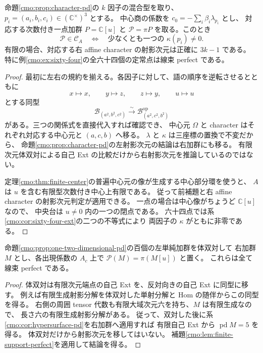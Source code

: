 \begin{proposition}
\label{cmo:prop:point-perfect}
命題\ref{cmo:prop:character-pd}の $k$ 因子の混合型を取り、
$p_i=(a_i,b_i,c_i)\in(\mathbb C^\times)^3$ とする。
中心商の係数を $c_0=-\sum_i\beta_i\lambda_{p_i}$ とし、
対応する次数付き一点加群 $P=\mathbb C[u]$ と
$\mathcal P=\pi P$ を取る。このとき
\begin{equation}\label{cmo:eq:point-perfect-criterion}
 \mathcal P\in\mathcal C_A
 \quad\Longleftrightarrow\quad
 \text{少なくとも一つの }\kappa(p_i)\ne0.
\end{equation}
有限の場合、対応する右 affine character の射影次元は正確に $3k-1$ である。
特に例\ref{cmo:ex:sixty-four}の全六十四個の定常点は線束 perfect である。
\end{proposition}
\begin{proof}
最初に左右の規約を揃える。各因子に対して、語の順序を逆転させるとともに
\[
 x\longmapsto x,\qquad y\longmapsto z,\qquad
 z\longmapsto y,\qquad u\longmapsto u
\]
とする同型
\[
 \mathcal B_{(a^2,b^2,c^2)}
 \xrightarrow{\sim}
 \mathcal B_{(a^2,c^2,b^2)}^{\mathrm{op}}
\]
がある。三つの関係式を直接代入すれば確認でき、
中心元 $\Omega$ と character はそれぞれ対応する中心元と $(a,c,b)$ へ移る。
$\lambda$ と $\kappa$ は三座標の置換で不変だから、
命題\ref{cmo:prop:character-pd}の左射影次元の結論は右加群にも移る。
有限次元体双対による自己 Ext の比較だけから右射影次元を推論しているのではない。

定理\ref{cmo:thm:finite-center}の普遍中心元の像が生成する中心部分環を使うと、
$A$ は $u$ を含む有限型次数付き中心上有限である。
従って前補題と右 affine character の射影次元判定が適用できる。
一点の場合は中心像がちょうど $\mathbb C[u]$ なので、
中央台は $u\ne0$ 内の一つの閉点である。
六十四点では系\ref{cmo:cor:sixty-four-ext}の二つの不等式により
両因子の $\kappa$ がともに非零である。
\end{proof}

\begin{corollary}
\label{cmo:cor:hundred-perfect}
命題\ref{cmo:prop:one-two-dimensional-pd}の百個の左単純加群を体双対して
右加群 $M$ とし、各出現係数の $A_c$ 上で $\mathcal P(M)=\pi(M[u])$ と置く。
これらは全て線束 perfect である。
\end{corollary}
\begin{proof}
体双対は有限次元端点の自己 Ext を、反対向きの自己 Ext に同型に移す。
例えば有限生成射影分解を体双対した単射分解と Hom の随伴からこの同型を得る。
右側の周囲 tensor 代数も有限大域次元六を持ち、$M$ は有限生成なので、
長さ六の有限生成射影分解がある。
従って、双対した後に系\ref{cmo:cor:hypersurface-pd}を右加群へ適用すれば
有限自己 Ext から $\operatorname{pd}M=5$ を得る。
体双対だけから射影次元を移してはいない。
補題\ref{cmo:lem:finite-support-perfect}を適用して結論を得る。
\end{proof}

